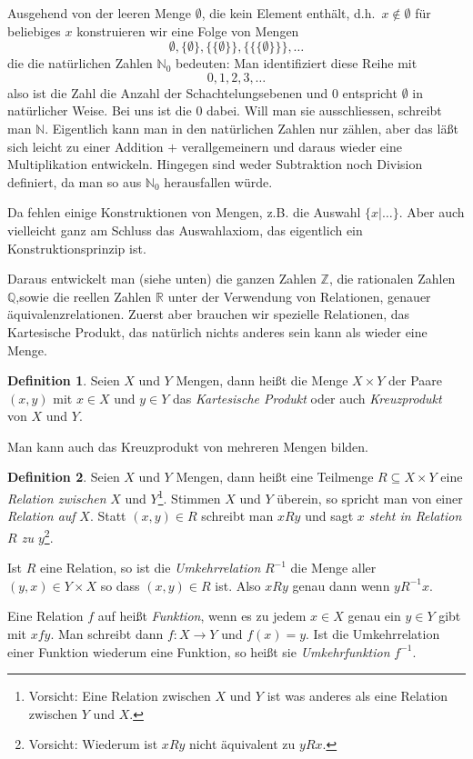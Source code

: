 \documentclass[index=totoc]{scrartcl}%
\theoremstyle{definition}
\newtheorem{defi}{Definition}[section]
\newcommand{\N}{\mathbb N}
\newcommand{\Z}{\mathbb Z}
\newcommand{\Q}{\mathbb Q}
\newcommand{\R}{\mathbb R}
\begin{document}
Ausgehend von der leeren Menge $\emptyset$, die kein Element enthält,
d.h.~$x\not\in\emptyset$ für beliebiges $x$
konstruieren wir eine Folge von Mengen
%
\begin{equation*}
  \emptyset, \{\emptyset\}, \{\{\emptyset\}\}, \{\{\{\emptyset\}\}\}, \dots 
\end{equation*}
%
die die natürlichen Zahlen $\N_0$ bedeuten:
Man identifiziert diese Reihe mit
%
\begin{equation*}
  0, 1, 2, 3, \dots 
\end{equation*}
%
also ist die Zahl die Anzahl der Schachtelungsebenen
und $0$ entspricht $\emptyset$ in natürlicher Weise.
Bei uns ist die $0$ dabei. Will man sie ausschliessen, schreibt man $\N$.
Eigentlich kann man in den natürlichen Zahlen nur zählen,
aber das läßt sich leicht zu einer Addition $+$ verallgemeinern
und daraus wieder eine Multiplikation entwickeln.
Hingegen sind weder Subtraktion noch Division definiert,
da man so aus $\N_0$ herausfallen würde. 



Da fehlen einige Konstruktionen von Mengen, z.B. die Auswahl $\{x|\dots\}$.
Aber auch vielleicht ganz am Schluss das Auswahlaxiom,
das eigentlich ein Konstruktionsprinzip ist. 


Daraus entwickelt man (siehe unten) die ganzen Zahlen $\Z$,
die rationalen Zahlen $\Q$,sowie die reellen Zahlen $\R$
unter der Verwendung von Relationen, genauer äquivalenzrelationen.
Zuerst aber brauchen wir spezielle Relationen, das Kartesische Produkt,
das natürlich nichts anderes sein kann als wieder eine Menge.

\begin{defi}
  Seien $X$ und $Y$ Mengen, dann heißt die Menge $X\times Y$
  der Paare $(x,y)$ mit $x\in X$ und $y\in Y$
  das {\em Kartesische Produkt} oder auch {\em Kreuzprodukt} von $X$ und $Y$. 
\end{defi}

Man kann auch das Kreuzprodukt von mehreren Mengen bilden. 

\begin{defi}
  Seien $X$ und $Y$ Mengen, dann heißt eine Teilmenge $R\subseteq X\times Y$
  eine {\em Relation zwischen} $X$ und $Y$\footnote{%
    Vorsicht: Eine Relation zwischen $X$ und $Y$ ist was anderes
    als eine  Relation zwischen $Y$ und $X$.}.
  Stimmen $X$ und $Y$ überein,
  so spricht man von einer {\em Relation auf} $X$.
  Statt $(x,y)\in R$ schreibt man $xRy$ und sagt
  {\em $x$ steht in Relation $R$ zu $y$}\footnote{%
    Vorsicht: Wiederum ist $xRy$ nicht äquivalent zu $yRx$.}. 

  Ist $R$ eine Relation, so ist die {\em Umkehrrelation} $R^{-1}$ 
  die Menge aller $(y,x)\in Y\times X$ so dass $(x,y)\in R$ ist.
  Also $xRy$ genau dann wenn $yR^{-1}x$. 

  Eine Relation $f$ auf heißt {\em Funktion},
  wenn es zu jedem $x\in X$ genau ein $y\in Y$ gibt mit $xfy$.
  Man schreibt dann $f\colon X\to Y$ und $f(x)=y$.
  Ist die Umkehrrelation einer Funktion wiederum eine Funktion,
  so heißt sie {\em Umkehrfunktion} $f^{-1}$. 
\end{defi}
\end{document}
